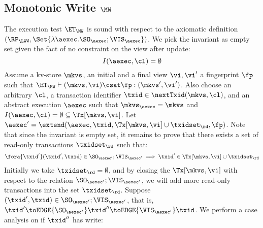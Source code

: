 \subsection{Monotonic Write \( \MW \)}
\label{sec:sound-complete-mw}

The execution test $\ET_\MW$ is sound with respect to the axiomatic definition 
$(\RP_{\LWW}, \Set{\lambda \aexec. \SO_{\aexec} ; \VIS_{\aexec} })$.
We pick the invariant as empty set given the fact of no constraint on the view after update:
\[ 
    I( \aexec, \cl ) = \emptyset 
\]
Assume a kv-store $\mkvs$, an initial and a final view $\vi, \vi'$  a fingerprint $\fp$ 
such that $\ET_{\MW} \vdash (\mkvs, \vi) \csat \fp: (\mkvs',\vi')$. 
Also choose an arbitrary $\cl$, a transaction identifier $\txid \in \nextTxid(\mkvs, \cl)$, 
and an abstract execution $\aexec$ such that $\mkvs_{\aexec} = \mkvs$ and 
\( I(\aexec, \cl) =  \emptyset \subseteq \Tx[\mkvs, \vi] \).
Let \( \aexec' = \extend(\aexec, \txid, \Tx[\mkvs, \vi] \cup \txidset_\rd, \fp ) \).
Note that since the invariant  is empty set, it remains to prove that there exists a set of read-only transactions \( \txidset_\rd \) such that:
\[
    \begin{array}{@{}l@{}}
        \fora{ \txid' }  (\txid' ,\txid)  \in \SO_{\aexec'} ; \VIS_{\aexec'}
        \implies \txid' \in \Tx[\mkvs, \vi] \cup \txidset_\rd
    \end{array}
\]
Initially we take \( \txidset_\rd = \emptyset \), 
and by closing the \( \Tx[\mkvs, \vi] \) with respect to the relation \( \SO_{\aexec'} ; \VIS_{\aexec'} \),
we will add more read-only transactions into the set \( \txidset_\rd\).
Suppose \( (\txid' ,\txid)  \in \SO_{\aexec'} ; \VIS_{\aexec'} \), 
that is, \( \txid' \toEDGE{\SO_{\aexec'}} \txid'' \toEDGE{\VIS_{\aexec'}} \txid \).
We perform a case analysis on if \( \txid'' \) has write:
